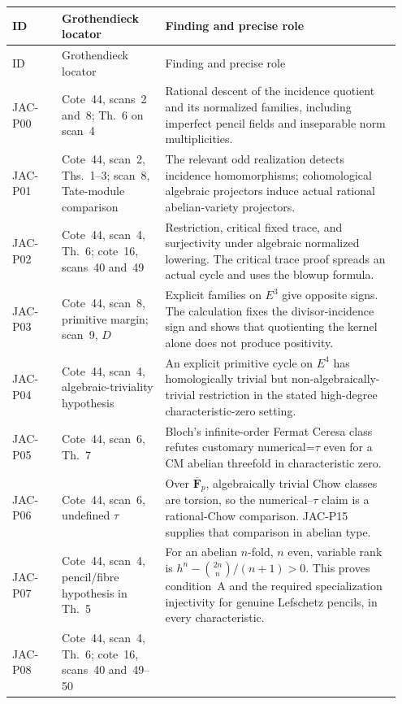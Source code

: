 \begingroup
\small
\setlength{\tabcolsep}{4pt}
\renewcommand{\arraystretch}{1.12}
\begin{longtable}{@{}p{0.12\linewidth}p{0.25\linewidth}p{0.58\linewidth}@{}}
\toprule
ID & Grothendieck locator & Finding and precise role\\
\midrule
\endfirsthead
\toprule
ID & Grothendieck locator & Finding and precise role\\
\midrule
\endhead
JAC-P00 & Cote~44, scans~2 and~8; Th.~6 on scan~4 &
Rational descent of the incidence quotient and its normalized
families, including imperfect pencil fields and inseparable
norm multiplicities.\\
JAC-P01 & Cote~44, scan~2, Ths.~1--3; scan~8, Tate-module comparison &
The relevant odd realization detects incidence homomorphisms;
cohomological algebraic projectors induce actual rational
abelian-variety projectors.\\
JAC-P02 & Cote~44, scan~4, Th.~6; cote~16, scans~40 and~49 &
Restriction, critical fixed trace, and surjectivity under algebraic
normalized lowering. The critical trace proof spreads an actual
cycle and uses the blowup formula.\\
JAC-P03 & Cote~44, scan~8, primitive margin; scan~9, $D$ &
Explicit families on $E^3$ give opposite signs. The calculation
fixes the divisor-incidence sign and shows that quotienting the
kernel alone does not produce positivity.\\
JAC-P04 & Cote~44, scan~4, algebraic-triviality hypothesis &
An explicit primitive cycle on $E^4$ has homologically trivial
but non-algebraically-trivial restriction in the stated high-degree
characteristic-zero setting.\\
JAC-P05 & Cote~44, scan~6, Th.~7 &
Bloch's infinite-order Fermat Ceresa class refutes customary
numerical=$\tau$ even for a CM abelian threefold in characteristic zero.\\
JAC-P06 & Cote~44, scan~6, undefined $\tau$ &
Over $\overline{\mathbf F}_p$, algebraically trivial Chow classes
are torsion, so the numerical--$\tau$ claim is a rational-Chow
comparison. JAC-P15 supplies that comparison in abelian type.\\
JAC-P07 & Cote~44, scan~4, pencil/fibre hypothesis in Th.~5 &
For an abelian $n$-fold, $n$ even, variable rank is
$h^n-\binom{2n}{n}/(n+1)>0$. This proves condition~A and
the required specialization injectivity for genuine Lefschetz
pencils, in every characteristic.\\
JAC-P08 & Cote~44, scan~4, Th.~6; cote~16, scans~40 and~49--50 &

\end{longtable}
